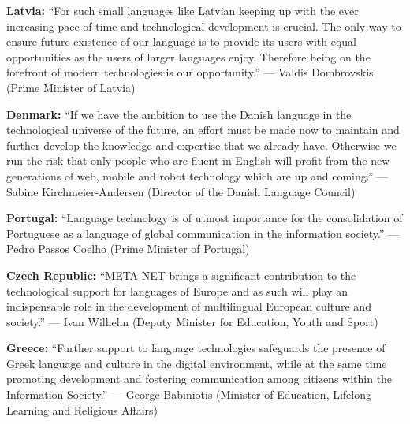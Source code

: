 \documentclass[10pt, plain]{../../metanetpaper}
\begin{document}
\maketitle

\clearpage

\thispagestyle{empty}

\makefundingnotice

\clearpage




\medskip \textbf{Latvia:} ``For such small languages like Latvian keeping up with the ever increasing pace of time and technological development is crucial. The only way to ensure future existence of our language is to provide its users with equal opportunities as the users of larger languages enjoy. Therefore being on the forefront of modern technologies is our opportunity.'' --- Valdis Dombrovskis (Prime Minister of Latvia)

\medskip \textbf{Denmark:} ``If we have the ambition to use the Danish language in the technological universe of the future, an effort must be made now to maintain and further develop the knowledge and expertise that we already have. Otherwise we run the risk that only people who are fluent in English will profit from the new generations of web, mobile and robot technology which are up and coming.'' --- Sabine Kirchmeier-Andersen (Director of the Danish Language Council)

\medskip \textbf{Portugal:} ``Language technology is of utmost importance for the consolidation of Portuguese as a language of global communication in the information society.'' --- Pedro Passos Coelho (Prime Minister of Portugal)

\medskip \textbf{Czech Republic:} ``META-NET brings a significant contribution to the technological support for languages of Europe and as such will play an indispensable role in the development of multilingual European culture and society.'' --- Ivan Wilhelm (Deputy Minister for Education, Youth and Sport)

\medskip \textbf{Greece:} ``Further support to language technologies safeguards the presence of Greek language and culture in the digital environment, while at the same time promoting development and fostering communication among citizens within the Information Society.'' --- George Babiniotis (Minister of Education, Lifelong Learning and Religious Affairs)
\end{document}
